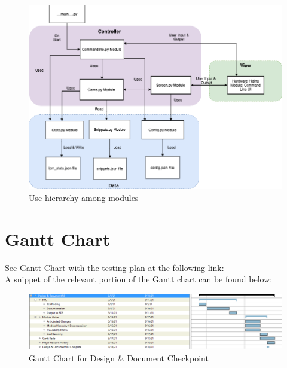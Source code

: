 \documentclass[12pt, titlepage]{article}
\begin{document}
\begin{figure}[!htbp]
\centering
\includegraphics[scale=0.5]{3xa3_archdiagram.png}
\caption{Use hierarchy among modules}
\label{FigUH}
\end{figure}

\section{Gantt Chart}

See Gantt Chart with the testing plan at the following \href{https://gitlab.cas.mcmaster.ca/modyj/3xa3/-/tree/master/ProjectSchedule}{link}: \\

A snippet of the relevant portion of the Gantt chart can be found below: 
\begin{figure}[!htbp]
\centering
\includegraphics[scale=0.5]{MG_Gantt.png}
\caption{Gantt Chart for Design & Document Checkpoint}
\label{FigUH}
\end{figure}


\end{document}
